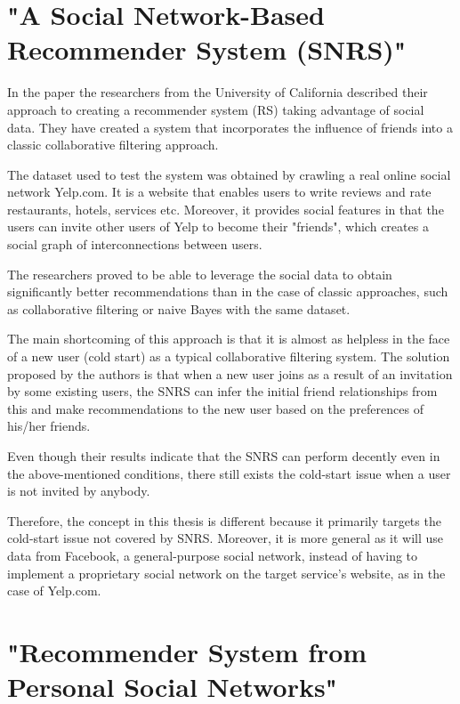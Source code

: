 \documentclass[12pt]{report}
\begin{document}
\section{"A Social Network-Based Recommender System (SNRS)"}

In the paper \cite{snrs} the researchers from the University of California described their approach to creating a recommender system (RS) taking advantage of social data. They have created a system that incorporates the influence of friends into a classic collaborative filtering approach. 

The dataset used to test the system was obtained by crawling a real online social network Yelp.com. It is a website that enables users to write reviews and rate restaurants, hotels, services etc. Moreover, it provides social features in that the users can invite other users of Yelp to become their "friends", which creates a social graph of interconnections between users.

The researchers proved to be able to leverage the social data to obtain significantly better recommendations than in the case of classic approaches, such as collaborative filtering or naive Bayes with the same dataset. 

\hbox{}
The main shortcoming of this approach is that it is almost as helpless in the face of a new user (cold start) as a typical collaborative filtering system. The solution proposed by the authors is that when a new user joins as a result of an invitation by some existing users, the SNRS can infer the initial friend relationships from this and make recommendations to the new user based on the preferences of his/her friends. 

Even though their results indicate that the SNRS can perform decently even in the above-mentioned conditions, there still exists the cold-start issue when a user is not invited by anybody.

Therefore, the concept in this thesis is different because it primarily targets the cold-start issue not covered by SNRS. Moreover, it is more general as it will use data from Facebook, a general-purpose social network, instead of having to implement a proprietary social network on the target service's website, as in the case of Yelp.com.


\section{"Recommender System from Personal Social Networks"}
\end{document}
